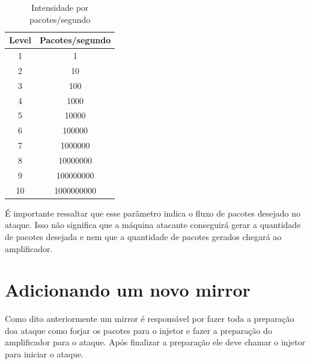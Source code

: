 \begin{table}[H]
\centering
\label{tab:pacotes/s}
\caption{Intensidade por pacotes/segundo}
\begin{tabular}{|c|c|}
\hline
\multicolumn{1}{|l|}{\textbf{Level}} & \multicolumn{1}{l|}{\textbf{Pacotes/segundo}} \\ \hline
1                                    & 1                                             \\ \hline
2                                    & 10                                            \\ \hline
3                                    & 100                                           \\ \hline
4                                    & 1000                                          \\ \hline
5                                    & 10000                                         \\ \hline
6                                    & 100000                                        \\ \hline
7                                    & 1000000                                       \\ \hline
8                                    & 10000000                                      \\ \hline
9                                    & 100000000                                     \\ \hline
10                                   & 1000000000                                    \\ \hline
\end{tabular}
\end{table}

É importante ressaltar que esse parâmetro indica o fluxo de pacotes desejado no ataque. Isso não significa que a máquina atacante conseguirá gerar a quantidade de pacotes desejada e nem que a quantidade de pacotes gerados chegará ao amplificador.

\section{Adicionando um novo mirror}

Como dito anteriormente um mirror é responsável por fazer toda a preparação doa ataque como forjar os pacotes para o injetor e fazer a preparação do amplificador para o ataque. Após finalizar a preparação ele deve chamar o injetor para iniciar o ataque.

